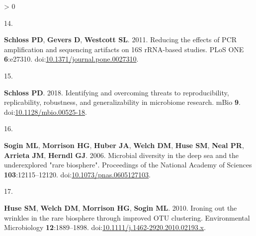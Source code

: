 \documentclass[
]{article}
\newlength{\cslhangindent}
\newlength{\csllabelwidth}
\newenvironment{CSLReferences}[3] %
 {%
  \setlength{\parindent}{0pt}
  \ifodd #1 \everypar{\setlength{\hangindent}{\cslhangindent}}\ignorespaces\fi
  \ifnum #2 > 0
  \setlength{\parskip}{#2\baselineskip}
  \fi
 }%
 {}
\newcommand{\CSLLeftMargin}[1]{\parbox[t]{\csllabelwidth}{#1}}
\newcommand{\CSLRightInline}[1]{\parbox[t]{\linewidth - \csllabelwidth}{#1}}
\begin{document}
\begin{CSLReferences}{0}{0}
{{NR}, \textbf{Chia N}, \textbf{Fierer N}, \textbf{White O}, \textbf{Cani
PD}, \textbf{Gajer P}, \textbf{Strandwitz P}, \textbf{Kashyap P},
\textbf{Dutton R}, \textbf{Park RS}, \textbf{Xavier RJ}, \textbf{Mills
RH}, \textbf{Krajmalnik-Brown R}, \textbf{Ley R}, \textbf{Owens SM},
\textbf{Klemmer S}, \textbf{Matamoros S}, \textbf{Mirarab S},
\textbf{Moorman S}, \textbf{Holmes S}, \textbf{Schwartz T},
\textbf{Eshoo-Anton TW}, \textbf{Vigers T}, \textbf{Pandey V},
\textbf{Treuren WV}, \textbf{Fang X}, \textbf{Xu ZZ}, \textbf{Jarmusch
A}, \textbf{Geier J}, \textbf{Reeve N}, \textbf{Silva R},
\textbf{Kopylova E}, \textbf{Nguyen D}, \textbf{Sanders K},
\textbf{Benitez RAS}, \textbf{Heale AC}, \textbf{Abramson M},
\textbf{Waldispühl J}, \textbf{Butyaev A}, \textbf{Drogaris C},
\textbf{Nazarova E}, \textbf{Ball M}, \textbf{Gunderson B}. 2018.
American gut: An open platform for citizen science microbiome research.
{mSystems} \textbf{3}.
doi:\href{https://doi.org/10.1128/msystems.00031-18}{10.1128/msystems.00031-18}.}

\leavevmode\hypertarget{ref-Schloss2011}{}%
\CSLLeftMargin{14. }
\CSLRightInline{\textbf{Schloss PD}, \textbf{Gevers D}, \textbf{Westcott
SL}. 2011. Reducing the effects of {PCR} amplification and sequencing
artifacts on 16S {rRNA}-based studies. {PLoS} {ONE} \textbf{6}:e27310.
doi:\href{https://doi.org/10.1371/journal.pone.0027310}{10.1371/journal.pone.0027310}.}

\leavevmode\hypertarget{ref-Schloss2018}{}%
\CSLLeftMargin{15. }
\CSLRightInline{\textbf{Schloss PD}. 2018. Identifying and overcoming
threats to reproducibility, replicability, robustness, and
generalizability in microbiome research. {mBio} \textbf{9}.
doi:\href{https://doi.org/10.1128/mbio.00525-18}{10.1128/mbio.00525-18}.}

\leavevmode\hypertarget{ref-Sogin2006}{}%
\CSLLeftMargin{16. }
\CSLRightInline{\textbf{Sogin ML}, \textbf{Morrison HG}, \textbf{Huber
JA}, \textbf{Welch DM}, \textbf{Huse SM}, \textbf{Neal PR},
\textbf{Arrieta JM}, \textbf{Herndl GJ}. 2006. Microbial diversity in
the deep sea and the underexplored "rare biosphere". Proceedings of the
National Academy of Sciences \textbf{103}:12115--12120.
doi:\href{https://doi.org/10.1073/pnas.0605127103}{10.1073/pnas.0605127103}.}

\leavevmode\hypertarget{ref-Huse2010}{}%
\CSLLeftMargin{17. }
\CSLRightInline{\textbf{Huse SM}, \textbf{Welch DM}, \textbf{Morrison
HG}, \textbf{Sogin ML}. 2010. Ironing out the wrinkles in the rare
biosphere through improved {OTU} clustering. Environmental Microbiology
\textbf{12}:1889--1898.
doi:\href{https://doi.org/10.1111/j.1462-2920.2010.02193.x}{10.1111/j.1462-2920.2010.02193.x}.}


\end{CSLReferences}
\end{document}
